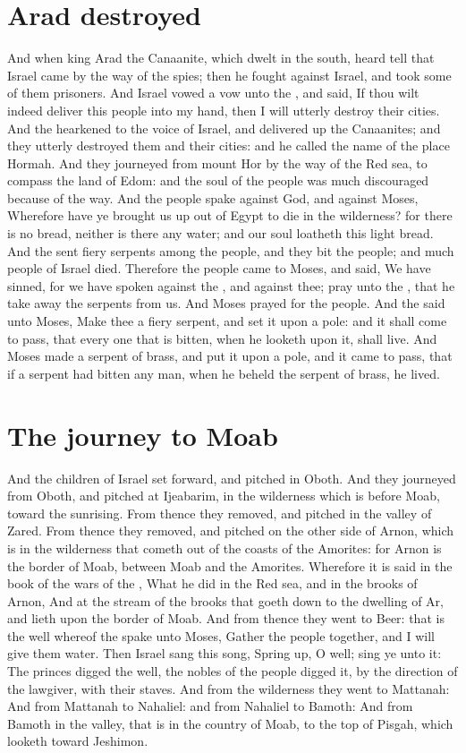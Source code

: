 \section*{Arad destroyed}
\begin{biblechapter} %
\verse And when king Arad the Canaanite, which dwelt in the south, heard tell that Israel came by the way of the spies; then he fought against Israel, and took some of them prisoners.
\verse And Israel vowed a vow unto the \LORD, and said, If thou wilt indeed deliver this people into my hand, then I will utterly destroy their cities.
\verse And the \LORD hearkened to the voice of Israel, and delivered up the Canaanites; and they utterly destroyed them and their cities: and he called the name of the place Hormah.
\verse And they journeyed from mount Hor by the way of the Red sea, to compass the land of Edom: and the soul of the people was much discouraged because of the way.
\verse And the people spake against God, and against Moses, Wherefore have ye brought us up out of Egypt to die in the wilderness? for there is no bread, neither is there any water; and our soul loatheth this light bread.
\verse And the \LORD sent fiery serpents among the people, and they bit the people; and much people of Israel died.
\verse Therefore the people came to Moses, and said, We have sinned, for we have spoken against the \LORD, and against thee; pray unto the \LORD, that he take away the serpents from us. And Moses prayed for the people.
\verse And the \LORD said unto Moses, Make thee a fiery serpent, and set it upon a pole: and it shall come to pass, that every one that is bitten, when he looketh upon it, shall live.
\verse And Moses made a serpent of brass, and put it upon a pole, and it came to pass, that if a serpent had bitten any man, when he beheld the serpent of brass, he lived.
\section*{The journey to Moab}
\verse And the children of Israel set forward, and pitched in Oboth.
\verse And they journeyed from Oboth, and pitched at Ijeabarim, in the wilderness which is before Moab, toward the sunrising.
\verse From thence they removed, and pitched in the valley of Zared.
\verse From thence they removed, and pitched on the other side of Arnon, which is in the wilderness that cometh out of the coasts of the Amorites: for Arnon is the border of Moab, between Moab and the Amorites.
\verse Wherefore it is said in the book of the wars of the \LORD, What he did in the Red sea, and in the brooks of Arnon,
\verse And at the stream of the brooks that goeth down to the dwelling of Ar, and lieth upon the border of Moab.
\verse And from thence they went to Beer: that is the well whereof the \LORD spake unto Moses, Gather the people together, and I will give them water.
\verse Then Israel sang this song, Spring up, O well; sing ye unto it:
\verse The princes digged the well, the nobles of the people digged it, by the direction of the lawgiver, with their staves. And from the wilderness they went to Mattanah:
\verse And from Mattanah to Nahaliel: and from Nahaliel to Bamoth:
\verse And from Bamoth in the valley, that is in the country of Moab, to the top of Pisgah, which looketh toward Jeshimon.

\end{biblechapter}
